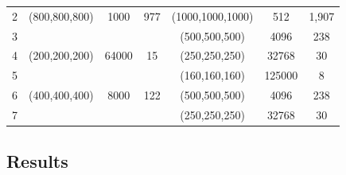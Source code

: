 \documentclass[sigconf, nonacm]{acmart}
\begin{document}
\begin{table}
\begin{tabular}{c|ccc|ccc}
   2 & (800,800,800) & 1000     & 977    & (1000,1000,1000) & 512     &  1,907 \\
   \rowcolor{black!10}
   3 &               &        &           & (500,500,500)  & 4096    & 238 \\
   4 & (200,200,200) & 64000     & 15    & (250,250,250) & 32768     &  30 \\
   5 &               &        &           & (160,160,160)  & 125000    & 8 \\
   \rowcolor{black!10}
   6 & (400,400,400) & 8000     & 122    & (500,500,500) & 4096     &  238 \\
   \rowcolor{black!10}
   7 &               &        &           & (250,250,250)  & 32768    & 30 \\

   \end{tabular}
   \label{tab:exp}
\end{table}

\subsection{Results}
\end{document}
